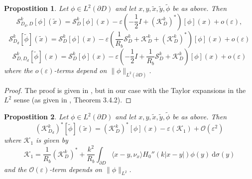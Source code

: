\documentclass[a4paper]{article}
\newtheorem{prop}{Propostition}
\theoremstyle{definition}
\renewcommand{\S}{\mathcal{S}}
\newcommand{\K}{\mathcal{K}}
\renewcommand{\O}{\mathcal{O}}
\renewcommand{\epsilon}{\varepsilon}
\newcommand{\dx}{\: \mathrm{d}}
\begin{document}
\begin{prop}\label{prop:asympsingle}
	Let $\phi \in L^2(\partial D)$ and let $x,y,\tilde{x},\tilde{y},\tilde{\phi}$ be as above. Then 
\begin{equation*}
\S_{D_d,D}^k[\phi](\tilde{x}) = \S_D^k[\phi](x) -\epsilon \left(-\frac{1}{2}I + \left(\K_D^k\right)^*\right)[\phi](x) + o(\epsilon),
\end{equation*}
\begin{equation*}
\S_{D_d}^k[\tilde{\phi}](\tilde{x}) = \S_D^k[\phi](x) - \epsilon \left(\frac{1}{R_b}\S_D^k + \K_D^k + \left(\K_D^k\right)^*\right)[\phi](x) + o(\epsilon)
\end{equation*}
\begin{equation*}
\S_{D,D_d}^k[\tilde{\phi}](x) = \S_D^k[\phi](x) - \epsilon \left(-\frac{1}{2}I+ \frac{1}{R_b}\S_D^k + \K_D^k \right)[\phi](x) + o(\epsilon)
\end{equation*}
where the $o(\epsilon)$-terms depend on $\|\phi\|_{L^2(\partial D)}$.
\end{prop}
\begin{proof}
The proof is given in \cite{asymptotics}, but in our case with the Taylor expansions in the $L^2$ sense (as given in \cite{weakdifffcn}, Theorem 3.4.2).
\end{proof}
\begin{prop} \label{prop:asympK}
	Let $\phi \in L^2(\partial D)$ and let $x,y,\tilde{x},\tilde{y},\tilde{\phi}$ be as above. Then 
	\begin{equation*}
	\left(\K_{D_d}^k\right)^*[\tilde{\phi}](\tilde{x}) = \left(\K_{D}^k\right)^*[\phi](x) - \epsilon \left(\K_1\right) + \O(\epsilon^2)
	\end{equation*}
	where $\K_1$ is given by
	\begin{equation*}
	\K_1 = \frac{1}{R_b}\left(\K_D^k\right)^* + \frac{k^2}{R_b} \int_{\partial D} \langle x-y,\nu_x \rangle H_0''(k|x-y|)\phi(y)\dx \sigma(y)
	\end{equation*}
	and the $\O(\epsilon)$-term depends on $\|\phi\|_{L^2}$.
\end{prop}
\end{document}
